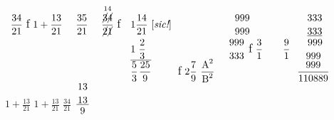 $\displaystyle\protect\begin{array}{lllllllll}
\protect\vspace{1mm} \displaystyle\protect\frac{34}{21} \ \protect\mbox{\protect\large f} \ \displaystyle1 +  \displaystyle\protect\frac{13}{21}\  
& %
\displaystyle\protect\frac{35}{21}\ 
& %
\displaystyle\protect\frac{\protect\overset{\protect\scriptstyle 14}{\protect\cancel{3}\protect\cancel{4}}}{\protect\cancel{2}\protect\cancel{1}} \ \protect\mbox{\protect\large f} 
& %
\displaystyle1 \displaystyle\protect\frac{14}{21}\ \lbrack \textit{sic!}\rbrack \ 
& %
& %
\hspace{9pt} \displaystyle\efrac{999}{999} 
& %
& %
& %
\hspace{6pt} \displaystyle\efrac{333}{\uline{333}} 
\\
& %
& %
& %
1\hspace{3pt}\displaystyle\protect\frac{2}{3}\hspace{1pt} 
& %
& %
\ \displaystyle\efrac{999}{333} \ \protect\mbox{\protect\large f}\ \displaystyle\protect\frac{3}{1}
& %
&  %
\displaystyle\frac{9}{1}
& %
\hspace{3pt}\displaystyle\efrac{\ 999}{999} 
\\
& %
& %
& %
\displaystyle\protect\overline{\protect\frac{5}{3} \hspace{1pt} \protect\frac{25}{9}} 
& %
\hspace{-7pt} \displaystyle\protect\mbox{\protect\large f} \ \displaystyle2 \protect\frac{7}{9} \ \protect\frac{\protect\raisebox{0ex}{A}^2}{\protect\raisebox{0ex}{B}^2}\protect
& %
& %
& %
& %
\hspace{-3pt}\displaystyle\genfrac{}{}{}{}{999}{110889}
\end{array}$
\pend
%
%
%
\vspace*{2mm}
\pstart
\hspace{3pt}$\displaystyle1+\frac{13}{21}$ \hspace{3pt} $\displaystyle1+\frac{13}{21}$ \hspace{3pt} $\displaystyle\frac{34}{21}$ \hspace{3pt} $\displaystyle\frac{\displaystyle\genfrac{}{}{0pt}{}{13}{13}}{9}$
\pend
%
%
%
\vspace{4mm}
\pstart
